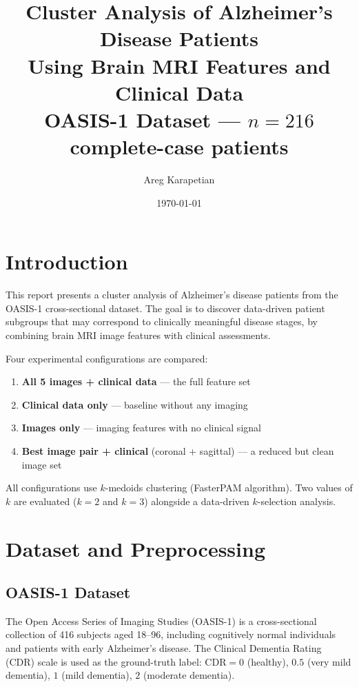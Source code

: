 \documentclass[12pt, a4paper]{article}
\title{
    \vspace{-1cm}
    {\Large\textbf{Cluster Analysis of Alzheimer's Disease Patients}}\\[6pt]
    {\large Using Brain MRI Features and Clinical Data}\\[4pt]
    {\normalsize OASIS-1 Dataset — $n = 216$ complete-case patients}
}
\author{Areg Karapetian}
\date{\today}
\begin{document}
\maketitle
\tableofcontents
\newpage

\section{Introduction}

This report presents a cluster analysis of Alzheimer's disease patients from the OASIS-1
cross-sectional dataset. The goal is to discover data-driven patient subgroups that may
correspond to clinically meaningful disease stages, by combining brain MRI image features
with clinical assessments.

Four experimental configurations are compared:
\begin{enumerate}[noitemsep]
    \item \textbf{All 5 images + clinical data} — the full feature set
    \item \textbf{Clinical data only} — baseline without any imaging
    \item \textbf{Images only} — imaging features with no clinical signal
    \item \textbf{Best image pair + clinical} (coronal + sagittal) — a reduced but clean image set
\end{enumerate}

All configurations use $k$-medoids clustering (FasterPAM algorithm).
Two values of $k$ are evaluated ($k=2$ and $k=3$) alongside a data-driven $k$-selection
analysis.

\section{Dataset and Preprocessing}

\subsection{OASIS-1 Dataset}
The Open Access Series of Imaging Studies (OASIS-1) is a cross-sectional collection of
416 subjects aged 18–96, including cognitively normal individuals and patients with early
Alzheimer's disease. The Clinical Dementia Rating (CDR) scale is used as the ground-truth
label: $\text{CDR}=0$ (healthy), $0.5$ (very mild dementia), $1$ (mild dementia),
$2$ (moderate dementia).
\end{document}
